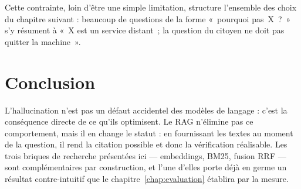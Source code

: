 Cette contrainte, loin d'être une simple limitation, structure l'ensemble des choix du chapitre
suivant : beaucoup de questions de la forme «~pourquoi pas~X~?~» s'y résument à «~X est un service
distant~; la question du citoyen ne doit pas quitter la machine~».

\section*{Conclusion}

L'hallucination n'est pas un défaut accidentel des modèles de langage : c'est la conséquence
directe de ce qu'ils optimisent. Le RAG n'élimine pas ce comportement, mais il en change le
statut : en fournissant les textes au moment de la question, il rend la citation possible et donc
la vérification réalisable. Les trois briques de recherche présentées ici --- embeddings, BM25,
fusion RRF --- sont complémentaires par construction, et l'une d'elles porte déjà en germe un
résultat contre-intuitif que le chapitre~\ref{chap:evaluation} établira par la mesure.
